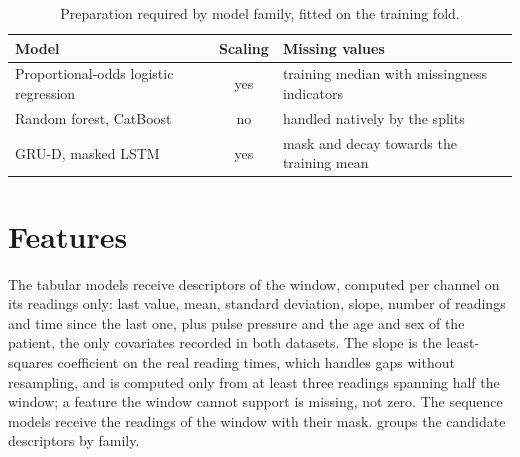\begin{table}[htbp]
\centering\footnotesize
\caption{Preparation required by model family, fitted on the training fold.}\label{tab:model-prep}
\begin{tabularx}{\textwidth}{@{}X c X@{}}
\toprule
\textbf{Model} & \textbf{Scaling} & \textbf{Missing values} \\
\midrule
Proportional-odds logistic regression & yes & training median with missingness indicators \\
Random forest, CatBoost & no & handled natively by the splits \\
GRU-D, masked LSTM & yes & mask and decay towards the training mean \\
\bottomrule
\end{tabularx}
\end{table}

\section{Features}\label{sec:feature-eng}\label{sec:features}\label{sec:budget}

The tabular models receive descriptors of the window, computed per channel on its readings only: last value, mean, standard deviation, slope, number of readings and time since the last one, plus pulse pressure and the age and sex of the patient, the only covariates recorded in both datasets. The slope is the least-squares coefficient on the real reading times, which handles gaps without resampling, and is computed only from at least three readings spanning half the window; a feature the window cannot support is missing, not zero. The sequence models receive the readings of the window with their mask.  groups the candidate descriptors by family.

